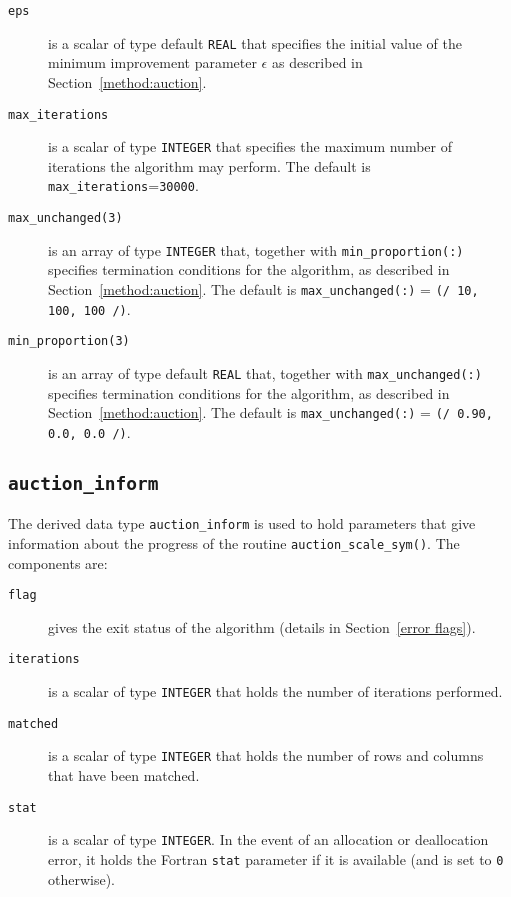 \begin{description}

\item[\texttt{eps}] is a scalar of type default \texttt{REAL} that specifies the initial value of the minimum improvement parameter $\epsilon$ as described in Section~\ref{method:auction}.

\item[\texttt{max\_iterations}] is a scalar of type \texttt{INTEGER} that specifies the maximum number of iterations the algorithm may perform. The default is \texttt{max\_iterations}=\texttt{30000}.

\item[\texttt{max\_unchanged(3)}] is an array of type \texttt{INTEGER} that, together with \texttt{min\_proportion(:)} specifies termination conditions for the algorithm, as described in Section~\ref{method:auction}. The default is \texttt{max\_unchanged(:)} = \texttt{(/ 10, 100, 100 /)}.

\item[\texttt{min\_proportion(3)}] is an array of type default \texttt{REAL} that, together with \texttt{max\_unchanged(:)} specifies termination conditions for the algorithm, as described in Section~\ref{method:auction}. The default is \texttt{max\_unchanged(:)} = \texttt{(/ 0.90, 0.0, 0.0 /)}.

\end{description}

\subsection{\texttt{auction\_inform}} \label{type:auction_inform}

The derived data type \texttt{auction\_inform} is used to hold parameters that
give information about the progress of the routine
\texttt{auction\_scale\_sym()}. The components are:

\begin{description}

\item[\texttt{flag}] gives the exit status of the algorithm (details in Section~\ref{error flags}).

\item[\texttt{iterations}] is a scalar of type \texttt{INTEGER} that holds the number of iterations performed.

\item[\texttt{matched}] is a scalar of type \texttt{INTEGER} that holds the number of rows and columns that have been matched.

\item[\texttt{stat}] is a scalar of type \texttt{INTEGER}. In the event of an allocation or deallocation error, it holds the Fortran \texttt{stat} parameter if it is available (and is set to \texttt{0} otherwise).

\end{description}


